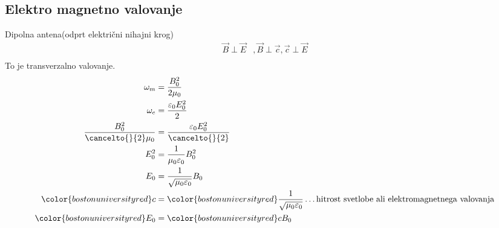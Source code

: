 {\color{indiagreen}\subsection{Elektro magnetno valovanje}}
Dipolna antena(odprt električni nihajni krog)\\
\begin{align*}
	\vec{B} \perp \vec{E} &, \vec{B} \perp \vec{c}, \vec{c} \perp \vec{E}\\
\end{align*}
To je {\color{bostonuniversityred}transverzalno valovanje}.\\
\begin{align*}
	\omega_m &= \frac{B_0^2}{2\mu_0}\\
	\omega_e &= \frac{\varepsilon_0 E_0^2}{2}\\
	\frac{B_0^2}{\cancelto{}{2}\mu_0} &= \frac{\varepsilon_0 E_0^2}{\cancelto{}{2}}\\
	E_0^2 &= \frac{1}{\mu_0 \varepsilon_0} B_0^2\\
	E_0 &= \frac{1}{\sqrt{\mu_0 \varepsilon_0}} B_0\\
	{\color{bostonuniversityred}c} &= {\color{bostonuniversityred}\frac{1}{\sqrt{\mu_0 \varepsilon_0}}} \dots \text{hitrost svetlobe ali elektromagnetnega valovanja}\\
	{\color{bostonuniversityred}E_0} &= {\color{bostonuniversityred}c B_0}\\
\end{align*}
